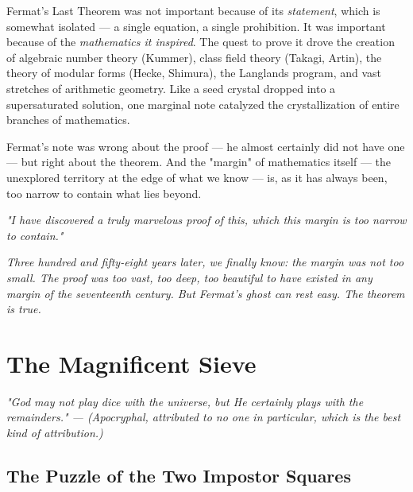 \documentclass[11pt,openright,twoside]{book}
\renewenvironment{quotation}{%
  \par\vspace{8pt}%
  \begin{list}{}{%
    \setlength{\leftmargin}{2em}%
    \setlength{\rightmargin}{2em}%
  }\item[]\itshape\color{pullquote}%
}{%
  \end{list}%
  \par\vspace{8pt}%
}
\theoremstyle{definition}
\begin{document}
Fermat's Last Theorem was not important because of its \textit{statement}, which is somewhat isolated --- a single equation, a single prohibition. It was important because of the \textit{mathematics it inspired}. The quest to prove it drove the creation of algebraic number theory (Kummer), class field theory (Takagi, Artin), the theory of modular forms (Hecke, Shimura), the Langlands program, and vast stretches of arithmetic geometry. Like a seed crystal dropped into a supersaturated solution, one marginal note catalyzed the crystallization of entire branches of mathematics.

Fermat's note was wrong about the proof --- he almost certainly did not have one --- but right about the theorem. And the "margin" of mathematics itself --- the unexplored territory at the edge of what we know --- is, as it has always been, too narrow to contain what lies beyond.


\bigskip


\textit{"I have discovered a truly marvelous proof of this, which this margin is too narrow to contain."}

\textit{Three hundred and fifty-eight years later, we finally know: the margin was not too small. The proof was too vast, too deep, too beautiful to have existed in any margin of the seventeenth century. But Fermat's ghost can rest easy. The theorem is true.}

\clearpage


\chapter{The Magnificent Sieve}
\label{ch:11}




\bigskip


\begin{quotation}
\noindent\itshape \textit{"God may not play dice with the universe, but He certainly plays with the remainders."} --- (Apocryphal, attributed to no one in particular, which is the best kind of attribution.)
\end{quotation}


\bigskip


\section{The Puzzle of the Two Impostor Squares}
\end{document}
